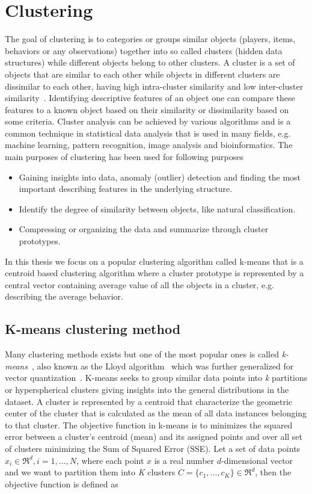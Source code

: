 \section{Clustering}
The goal of clustering is to categories or groups similar objects (players, items, behaviors or any observations) together into so called clusters (hidden data structures) while different objects belong to other clusters. A cluster is a set of objects that are similar to each other while objects in different clusters are dissimilar to each other, having high intra-cluster similarity and low inter-cluster similarity~\citep{Xu:2009Clu}. Identifying descriptive features of an object one can compare these features to a known object based on their similarity or dissimilarity based on some criteria. Cluster analysis can be achieved by various algorithms and is a common technique in statistical data analysis that is used in many fields, e.g. machine learning, pattern recognition, image analysis and bioinformatics. The main purposes of clustering has been used for following purposes
\begin{itemize}
\item Gaining insights into data, anomaly (outlier) detection and finding the most important describing features in the underlying structure.
\item Identify the degree of similarity between objects, like natural classification.
\item Compressing or organizing the data and summarize through cluster prototypes.
\end{itemize}

In this thesis we focus on a popular clustering algorithm called k-means that is a centroid based clustering algorithm where a cluster prototype is represented by a central vector containing average value of all the objects in a cluster, e.g. describing the average behavior.

\subsection{K-means clustering method}
Many clustering methods exists but one of the most popular ones is called \textit{k-means}~\citep{FORGYE.W.:1965,MacQueen:1967KMeans}, also known as the Lloyd algorithm~\citep{Lloyd:1982} which was further generalized for vector quantization~\citep{Linde:1980VQ,Gersho:1991VQS,Xu:2009Clu}. K-means seeks to group similar data points into \textit{k} partitions or hyperspherical clusters giving insights into the general distributions in the dataset. A cluster is represented by a centroid that characterize the geometric center of the cluster that is calculated as the mean of all data instances belonging to that cluster. The objective function in k-means is to minimizes the squared error between a cluster's centroid (mean) and its assigned points and over all set of clusters minimizing the Sum of Squared Error (SSE). Let a set of data points $x_i \in \Re^d, i=1,...,N$, where each point $x$ is a real number $d$-dimensional vector and we want to partition them into \textit{K} clusters $C=\{c_1,...,c_K\} \in \Re^d$, then the objective function is defined as

